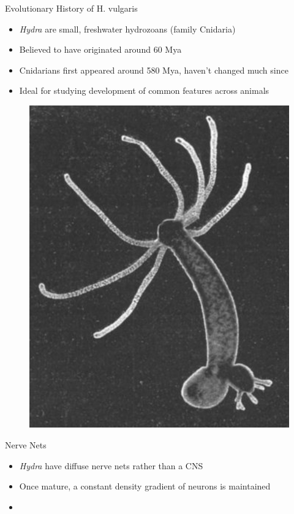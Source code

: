\documentclass[leqno,presentation,unknownkeysallowed]{beamer}
\begin{document}
\begin{frame}{Evolutionary History of H. vulgaris}
\begin{itemize}
\item \textit{Hydra} are small, freshwater hydrozoans (family Cnidaria)
\item Believed to have originated around 60 Mya \cite{age}
\item Cnidarians first appeared around 580 Mya, haven't changed much since
\item Ideal for studying development of common features across animals
\end{itemize}
\begin{figure}
\center
\includegraphics[scale=0.20]{hydra.png}
\end{figure}
\end{frame}

\begin{frame}{Nerve Nets}
\begin{itemize}
\item \textit{Hydra} have diffuse nerve nets rather than a CNS
\item Once mature, a constant density gradient of neurons is maintained \cite{density}
\item 
\end{itemize}
\end{frame}
\end{document}
